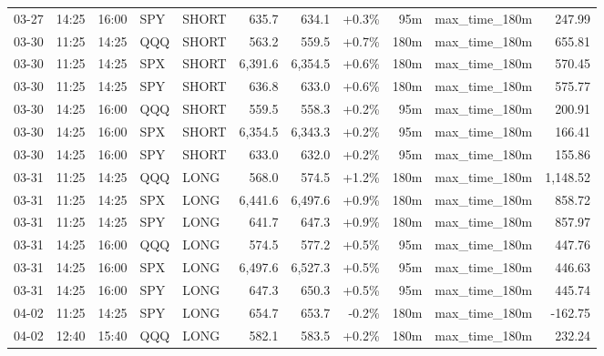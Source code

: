 \documentclass[11pt,a4paper,twoside]{article}
\begin{document}
\begin{center}
\begin{longtable}{>{\color{txtmain}}l l l l l r r r r >{\color{txtmain}}l r}
03-27 & 14:25 & 16:00 & SPY & SHORT & 635.7 & 634.1 & \textcolor{wingreen}{+0.3\%} & 95m & max\_time\_180m & \textcolor{wingreen}{247.99} \\
03-30 & 11:25 & 14:25 & QQQ & SHORT & 563.2 & 559.5 & \textcolor{wingreen}{+0.7\%} & 180m & max\_time\_180m & \textcolor{wingreen}{655.81} \\
03-30 & 11:25 & 14:25 & SPX & SHORT & 6,391.6 & 6,354.5 & \textcolor{wingreen}{+0.6\%} & 180m & max\_time\_180m & \textcolor{wingreen}{570.45} \\
03-30 & 11:25 & 14:25 & SPY & SHORT & 636.8 & 633.0 & \textcolor{wingreen}{+0.6\%} & 180m & max\_time\_180m & \textcolor{wingreen}{575.77} \\
03-30 & 14:25 & 16:00 & QQQ & SHORT & 559.5 & 558.3 & \textcolor{wingreen}{+0.2\%} & 95m & max\_time\_180m & \textcolor{wingreen}{200.91} \\
03-30 & 14:25 & 16:00 & SPX & SHORT & 6,354.5 & 6,343.3 & \textcolor{wingreen}{+0.2\%} & 95m & max\_time\_180m & \textcolor{wingreen}{166.41} \\
03-30 & 14:25 & 16:00 & SPY & SHORT & 633.0 & 632.0 & \textcolor{wingreen}{+0.2\%} & 95m & max\_time\_180m & \textcolor{wingreen}{155.86} \\
03-31 & 11:25 & 14:25 & QQQ & LONG & 568.0 & 574.5 & \textcolor{wingreen}{+1.2\%} & 180m & max\_time\_180m & \textcolor{wingreen}{1,148.52} \\
03-31 & 11:25 & 14:25 & SPX & LONG & 6,441.6 & 6,497.6 & \textcolor{wingreen}{+0.9\%} & 180m & max\_time\_180m & \textcolor{wingreen}{858.72} \\
03-31 & 11:25 & 14:25 & SPY & LONG & 641.7 & 647.3 & \textcolor{wingreen}{+0.9\%} & 180m & max\_time\_180m & \textcolor{wingreen}{857.97} \\
03-31 & 14:25 & 16:00 & QQQ & LONG & 574.5 & 577.2 & \textcolor{wingreen}{+0.5\%} & 95m & max\_time\_180m & \textcolor{wingreen}{447.76} \\
03-31 & 14:25 & 16:00 & SPX & LONG & 6,497.6 & 6,527.3 & \textcolor{wingreen}{+0.5\%} & 95m & max\_time\_180m & \textcolor{wingreen}{446.63} \\
03-31 & 14:25 & 16:00 & SPY & LONG & 647.3 & 650.3 & \textcolor{wingreen}{+0.5\%} & 95m & max\_time\_180m & \textcolor{wingreen}{445.74} \\
04-02 & 11:25 & 14:25 & SPY & LONG & 654.7 & 653.7 & \textcolor{lossred}{-0.2\%} & 180m & max\_time\_180m & \textcolor{lossred}{-162.75} \\
04-02 & 12:40 & 15:40 & QQQ & LONG & 582.1 & 583.5 & \textcolor{wingreen}{+0.2\%} & 180m & max\_time\_180m & \textcolor{wingreen}{232.24} \\

\end{longtable}
\end{center}
\end{document}
